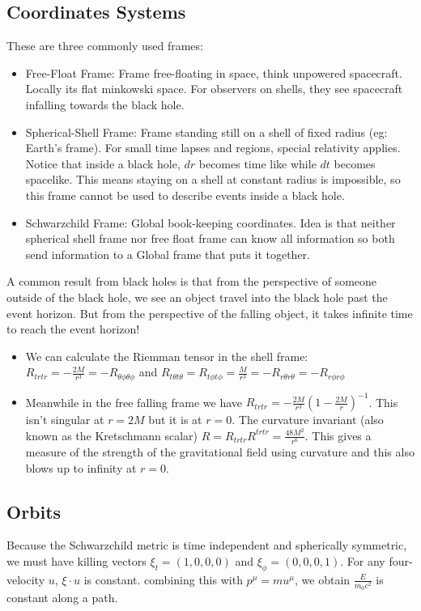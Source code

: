 \documentclass[11pt]{article}
\begin{document}
\subsection{Coordinates Systems}
These are three commonly used frames:
\begin{itemize}
    \item Free-Float Frame: Frame free-floating in space, think unpowered spacecraft. Locally its flat minkowski space. For observers on shells, they see spacecraft infalling towards
    the black hole.
    \item Spherical-Shell Frame: Frame standing still on a shell of fixed radius (eg: Earth's frame). For small time lapses and regions, special relativity applies. Notice that inside a
    black hole, $dr$ becomes time like while $dt$ becomes spacelike. This means staying on a shell at constant radius is impossible, so this frame cannot be used to describe events inside 
    a black hole.
    \item Schwarzchild Frame: Global book-keeping coordinates. Idea is that neither spherical shell frame nor free float frame can know all information so both send information to a Global
    frame that puts it together.
\end{itemize}

\noindent A common result from black holes is that from the perspective of someone outside of the black hole, we see an object travel into the black hole past the event horizon. But from the perspective
of the falling object, it takes infinite time to reach the event horizon!
\begin{itemize}
    \item We can calculate the Riemman tensor in the shell frame: $R_{trtr} = -\frac{2M}{r^3} = -R_{\theta\phi\theta\phi}$ and 
    $R_{t\theta t\theta} = R_{t \phi t \phi} = \frac{M}{r^3} = -R_{r\theta r \theta} = -R_{r \phi r\phi}$
    \item Meanwhile in the free falling frame we have $R_{trtr} = -\frac{2M}{r^3}(1-\frac{2M}{r})^{-1}$. This isn't singular at $r = 2M$ but it is at $r=0$. The curvature invariant (also known as
    the Kretschmann scalar) $R = R_{trtr}R^{trtr} = \frac{48M^2}{r^6}$. This gives a measure of the strength of the gravitational field using curvature and this also blows up to infinity at $r = 0$.
\end{itemize}

\subsection{Orbits}
Because the Schwarzchild metric is time independent and spherically symmetric, we must have killing vectors $\xi_{t} = (1,0,0,0)$ and $\xi_{\phi} = (0,0,0,1)$. 
For any four-velocity $u$, $\xi \cdot u$ is constant. combining this with $p^{\mu} =m u^{\mu}$, we obtain $\frac{E}{m_0 c^2}$ is constant along a path.
\end{document}
